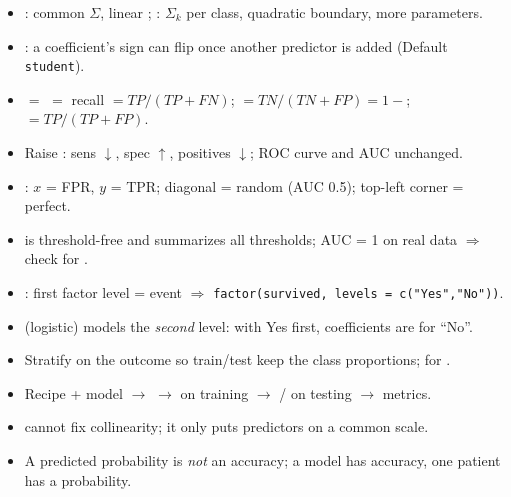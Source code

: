 \begin{keybox}
\begin{itemize}[leftmargin=1em,itemsep=0pt]
\item {}: common $\Sigma$, linear ; : $\Sigma_k$ per class, quadratic boundary, more parameters.
\item {}: a coefficient's sign can flip once another predictor is added (Default \texttt{student}).
\item {} $=$  $=$ recall $=TP/(TP+FN)$;  $=TN/(TN+FP)=1-$;  $=TP/(TP+FP)$.
\item Raise : sens $\downarrow$, spec $\uparrow$, positives $\downarrow$; ROC curve and AUC unchanged.
\item {}: $x$ = FPR, $y$ = TPR; diagonal = random (AUC 0.5); top-left corner = perfect.
\item {} is threshold-free and summarizes all thresholds; AUC = 1 on real data $\Rightarrow$ check for .
\item {}: first factor level = event $\Rightarrow$ \texttt{factor(survived, levels = c("Yes","No"))}.
\item {} (logistic) models the \emph{second} level: with Yes first, coefficients are for ``No''.
\item Stratify on the outcome so train/test keep the class proportions;  for .
\item Recipe + model $\to$  $\to$  on training $\to$ / on testing $\to$ metrics.
\item {} cannot fix collinearity; it only puts predictors on a common scale.
\item A predicted probability is \emph{not} an accuracy; a model has accuracy, one patient has a probability.
\end{itemize}
\end{keybox}

